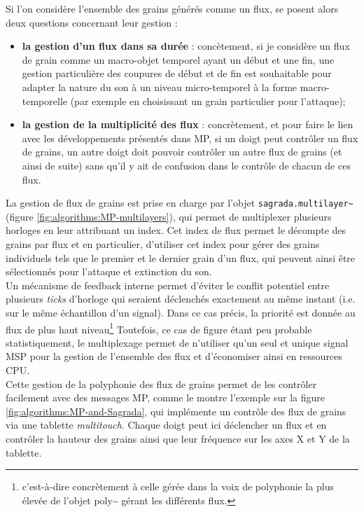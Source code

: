 \noindent Si l'on considère l'ensemble des grains générés comme un flux, se posent alors deux questions concernant leur gestion :
\vspace{-1em}
\begin{itemize}[noitemsep]
	\item \textbf{la gestion d'un flux dans sa durée} : concètement, si je considère un flux de grain comme un macro-objet temporel ayant un début et une fin, une gestion particulière des coupures de début et de fin est souhaitable pour adapter la nature du son à un niveau micro-temporel à la forme macro-temporelle (par exemple en choisissant un grain particulier pour l'attaque);
	\item \textbf{la gestion de la multiplicité des flux} : concrètement, et pour faire le lien avec les développements présentés dans MP, si un doigt peut contrôler un flux de grains, un autre doigt doit pouvoir contrôler un autre flux de grains (et ainsi de suite) sans qu'il y ait de confusion dans le contrôle de chacun de ces flux.
\end{itemize}

\noindent La gestion de flux de grains est prise en charge par l'objet \verb|sagrada.multilayer~| (figure \ref{fig:algorithms:MP-multilayers}), qui permet de multiplexer plusieurs horloges en leur attribuant un index. Cet index de flux permet le décompte des grains par flux et en particulier, d'utiliser cet index pour gérer des grains individuels tels que le premier et le dernier grain d'un flux, qui peuvent ainsi être sélectionnés pour l'attaque et extinction du son.\\
\indent Un mécanisme de feedback interne permet d'éviter le conflit potentiel entre plusieurs \textit{ticks} d'horloge qui seraient déclenchés exactement au même instant (i.e. sur le même échantillon d'un signal). Dans ce cas précis, la priorité est donnée au flux de plus haut niveau\footnote{c'est-à-dire concrètement à celle gérée dans la voix de polyphonie la plus élevée de l'objet poly\textasciitilde{} gérant les différents flux.} Toutefois, ce cas de figure étant peu probable statistiquement, le multiplexage permet de n'utiliser qu'un seul et unique signal \gls{MSP} pour la gestion de l'ensemble des flux et d'économiser ainsi en ressources \gls{CPU}.\\
\indent Cette gestion de la polyphonie des flux de grains permet de les contrôler facilement avec des messages MP, comme le montre l'exemple sur la figure \ref{fig:algorithms:MP-and-Sagrada}, qui implémente un contrôle des flux de grains via une tablette \textit{multitouch}. Chaque doigt peut ici déclencher un flux et en contrôler la hauteur des grains ainsi que leur fréquence sur les axes X et Y de la tablette.

